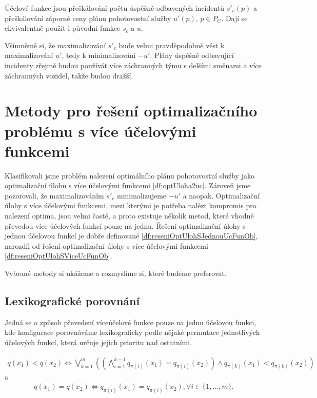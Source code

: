 Účelové funkce jsou přeškálování počtu úspěšně odbavených incidentů $s'_c(p)$ a přeškálování záporné ceny plánu pohotovostní služby $u'(p)$, $p \in P_C$.
Dají se ekvivalentně použít i původní funkce $s_c$ a $u$.

Všimněmě si, že maximalizování $s'_c$ bude velmi pravděpodobně vést k maximalizování $u'$, tedy k minimalizování $-u'$.
Plány úspěšně odbavující incidenty zřejmě budou používát více záchranných týmu s delšími směnami a více záchranných vozidel, takže budou dražší.

\section{Metody pro řešení optimalizačního problému s více účelovými funkcemi}\label{kap:metodyProReseniOptSViceUcel}

Klasifikovali jsme problém nalezení optimálního plánu pohotovostní služby jako optimalizační úlohu s více účelovými funkcemi \ref{df:optUloha2uc}.
Zároveň jsme pozorovali, že maximalizováním $s'_c$ minimalizujeme $-u'$ a naopak.
Optimalizační úlohy s více účelovými funkcemi, mezi kterými je potřeba nalézt kompromis pro nalezení optima, jsou velmi časté,
a proto existuje několik metod, které vhodně převedou více účelových funkcí pouze na jednu. 
Řešení optimalizační úlohy s jednou účelovou funkcí je dobře definované \ref{df:reseniOptUlohSJednouUcFunOb},
narozdíl od řešení optimalizační úlohy s více účelovými funkcemi \ref{df:reseniOptUlohSViceUcFunOb}.

Vybrané metody si ukážeme a rozmyslíme si, které budeme preferovat.

\subsection{Lexikografické porovnání}

Jedná se o způsob převedení víceúčelové funkce pouze na jednu účelovou funkci, kde konfigurace porovnáváme lexikograficky podle nějaké permutace jednotlivých účelových funkcí,
která určuje jejich prioritu nad ostatními.

\begin{definice}
  \begin{align*}
    q(x_1) < q(x_2) \Leftrightarrow \bigvee_{k=1}^m \left ( \left ( \bigwedge_{i=1}^{k-1} q_{\pi(i)}(x_1) = q_{\pi(i)}(x_2) \right ) \land q_{\pi(k)}(x_1) < q_{\pi(k)}(x_2) \right )
  \end{align*}
  a 
  \begin{align*}
    q(x_1) = q(x_2) \Leftrightarrow q_{\pi(i)}(x_1) = q_{\pi(i)}(x_2), \forall i \in \{ 1, \dots, m \}.
  \end{align*}
\end{definice}

